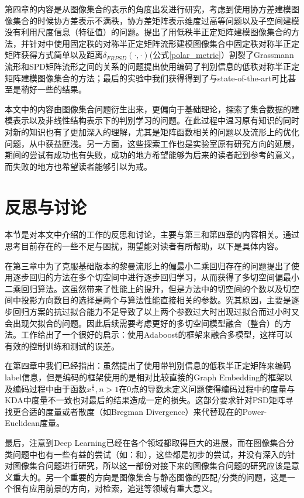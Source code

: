 第四章的内容是从图像集合的表示的角度出发进行研究，考虑到使用协方差建模图像集合的时候协方差表示不满秩，协方差矩阵表示维度过高等问题以及子空间建模没有利用尺度信息（特征值）的问题。提出了用低秩半正定矩阵建模图像集合的方法，并针对\cite{PSD_WACV}中使用固定秩的对称半正定矩阵流形建模图像集合中固定秩对称半正定矩阵获得方式简单以及距离$\delta_{FRPSD}(\cdot,\cdot)$(公式\ref{polar_metric}）割裂了Grassmann流形和SPD矩阵流形之间的关系的问题提出使用编码了判别信息的低秩对称半正定矩阵建模图像集合的方法；最后的实验中我们获得得到了与state-of-the-art可比甚至是稍好一些的结果。

本文中的内容由图像集合问题衍生出来，更偏向于基础理论，探索了集合数据的建模表示以及非线性结构表示下的判别学习的问题。在此过程中温习原有知识的同时对新的知识也有了更加深入的理解，尤其是矩阵函数相关的问题以及流形上的优化问题，从中获益匪浅。另一方面，这些探索工作也是实验室原有研究方向的延展，期间的尝试有成功也有失败，成功的地方希望能够为后来的读者起到参考的意义，而失败的地方也希望读者能够引以为戒。
\section{反思与讨论}
\label{sec:discuss}
本节是对本文中介绍的工作的反思和讨论，主要与第三和第四章的内容相关。通过思考目前存在的一些不足与困扰，期望能对读者有所帮助，以下是具体内容。

在第三章中为了克服基础版本的黎曼流形上的偏最小二乘回归存在的问题提出了使用逐步回归的方法在多个切空间中进行逐步回归学习，从而获得了多切空间偏最小二乘回归算法。这虽然带来了性能上的提升，但是方法中的切空间的个数以及切空间中投影方向数目的选择是两个与算法性能直接相关的参数。究其原因，主要是逐步回归方案的抗过拟合能力不足导致了以上两个参数过大时出现过拟合而过小时又会出现欠拟合的问题。因此后续需要考虑更好的多切空间模型融合（整合）的方法。工作\cite{RegionCov_pedestrain}给出了一个很好的启示：使用Adaboost的框架来融合多模型，这样可以有效的控制训练和测试的误差。

在第四章中我们已经指出：虽然提出了使用带判别信息的低秩半正定矩阵来编码label信息，但是编码的框架使用的是相对比较直接的Graph Embedding的框架以及编码过程中由于函数$x^{\frac{1}{n}},n>1$在0点的导数未定义问题使得编码过程中的度量与KDA中度量不一致也对最后的结果造成一定的损失。这部分要求针对PSD矩阵寻找更合适的度量或者散度（如Bregman Divergence）来代替现在的Power-Euclidean度量。

最后，注意到Deep Learning已经在各个领域都取得巨大的进展，而在图像集合分类问题中也有一些有益的尝试（如：\cite{Deeplearning_DRM}和\cite{Deeplearning_MMDML}），这些都是初步的尝试，并没有深入的针对图像集合问题进行研究，所以这一部份对接下来的图像集合问题的研究应该是意义重大的。另一个重要的方向是图像集合与静态图像的匹配/分类的问题，这是一个很有应用前景的方向，对检索，追逃等领域有重大意义。